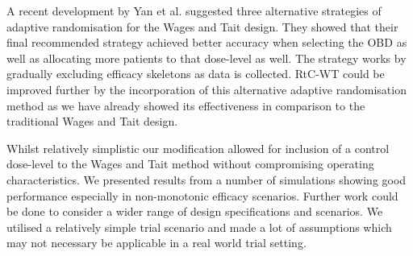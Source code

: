 A recent development by Yan et al. \cite{yanImprovedAdaptiveRandomization2019} suggested three alternative strategies of adaptive randomisation for the Wages and Tait design. They showed that their final recommended strategy achieved better accuracy when selecting the OBD as well as allocating more patients to that dose-level as well. The strategy works by gradually excluding efficacy skeletons as data is collected. RtC-WT could be improved further by the incorporation of this alternative adaptive randomisation method as we have already showed its effectiveness in comparison to the traditional Wages and Tait design.  

Whilst relatively simplistic our modification allowed for inclusion of a control dose-level to the Wages and Tait method without compromising operating characteristics. We presented results from a number of simulations showing good performance especially in non-monotonic efficacy scenarios. Further work could be done to consider a wider range of design specifications and scenarios. We utilised a relatively simple trial scenario and made a lot of assumptions which may not necessary be applicable in a real world trial setting.  

